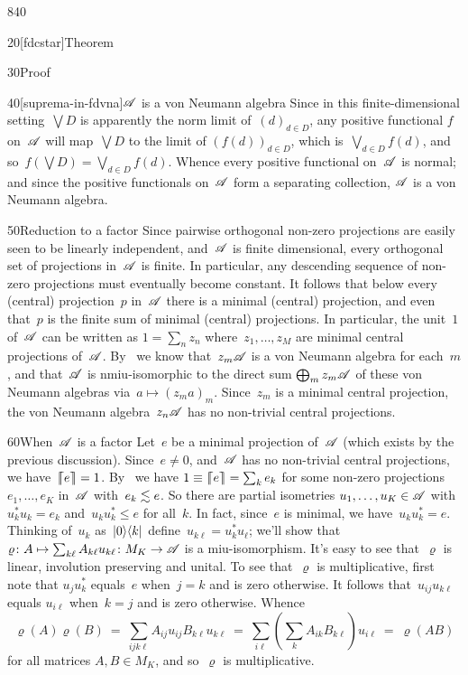 \begin{parsec}{840}
\begin{point}{20}[fdcstar]{Theorem}
\begin{point}{30}{Proof}
\begin{point}{40}[suprema-in-fdvna]{$\mathscr{A}$ is a von Neumann algebra}
Since in this finite-dimensional setting~$\bigvee D$
is apparently the norm limit of~$(d)_{d\in D}$,
any positive functional $f$ on~$\mathscr{A}$
will map~$\bigvee D$ to the limit of
$(f(d))_{d\in D}$,
which is~$\bigvee_{d\in D} f(d)$,
and so~$f(\bigvee D)=\bigvee_{d\in D} f(d)$.
Whence every positive functional on~$\mathscr{A}$
is normal; and since the positive functionals on~$\mathscr{A}$
form a separating collection,
$\mathscr{A}$ is a von Neumann algebra.
\end{point}
\begin{point}{50}{Reduction to a factor}%
Since pairwise orthogonal non-zero projections
are easily seen to be linearly independent,
and~$\mathscr{A}$ is finite dimensional,
every orthogonal set of projections in~$\mathscr{A}$ is finite.
In particular,
any descending sequence of non-zero projections must eventually become
constant.
It follows that below every (central) projection~$p$ in~$\mathscr{A}$
there is a minimal (central) projection,
and even that~$p$ is the finite sum of minimal (central) projections.
In particular,
the unit~$1$ of~$\mathscr{A}$ can be written
as $1=\sum_n z_n$ where~$z_1,\dotsc,z_M$ are minimal central projections
of~$\mathscr{A}$.
By~
we know that~$z_m\mathscr{A}$ is a von Neumann algebra for each~$m$,
and that~$\mathscr{A}$ is nmiu-isomorphic
to the direct sum $\bigoplus_m z_m \mathscr{A}$
of these von Neumann algebras
via~$a\mapsto (z_ma)_m$.
Since~$z_m$ is a minimal central projection,
the von Neumann algebra~$z_n \mathscr{A}$
has no non-trivial central projections.
\end{point}
\begin{point}{60}{When~$\mathscr{A}$ is a factor}%
Let~$e$ be a minimal
projection of~$\mathscr{A}$
(which exists by the previous discussion).
Since~$e\neq 0$,
and~$\mathscr{A}$ has no non-trivial central projections,
we have~$\left\lceil\!\!\left\lceil e\right\rceil\!\!\right\rceil=1$.
By~
we have $1\equiv \left\lceil\!\!\left\lceil e\right\rceil\!\!\right\rceil=\sum_k e_k$
for some non-zero projections $e_1,\dotsc,e_K$
in~$\mathscr{A}$
with~$e_k\vmleq e$.
So there are partial isometries
$u_1,\dotsc,u_K\in\mathscr{A}$
with $u_k^* u_k = e_k$
and~$u_ku_k^*\leq e$ for all~$k$.
In fact,
since~$e$ is minimal,
we have~$u_ku_k^* = e$.
Thinking of~$u_k$
as~$\left|0\right>\!\left<k\right|$
define~$u_{k\ell } = u_k ^* u_\ell$;
we'll show that
$\varrho\colon A\mapsto \sum_{k\ell} A_{k\ell}  u_{ k \ell}
\colon M_K\to\mathscr{A}$
is a miu-isomorphism.
It's easy to see that~$\varrho$
is linear, involution preserving and unital.
To see that~$\varrho$ is multiplicative,
first note that $u_j u_k^*$ equals~$e$ when~$j=k$
and is zero otherwise.
It follows
that~$u_{ij} u_{k\ell}$
equals $u_{i\ell}$
when~$k=j$ and is zero otherwise.
Whence
\begin{equation*}
	\textstyle
\varrho(A)\varrho(B)
\ =\  
	\sum_{ijk\ell}
	A_{ij}u_{ij} B_{k\ell}u_{k\ell}
\ = \ 
	\sum_{i\ell} ( \sum_k A_{ik} B_{k\ell}) u_{i\ell}
	\ = \ \varrho( AB)
\end{equation*}
for all matrices $A,B\in M_K$,
and so~$\varrho$ is multiplicative.


\end{point}
\end{point}
\end{point}
\end{parsec}
